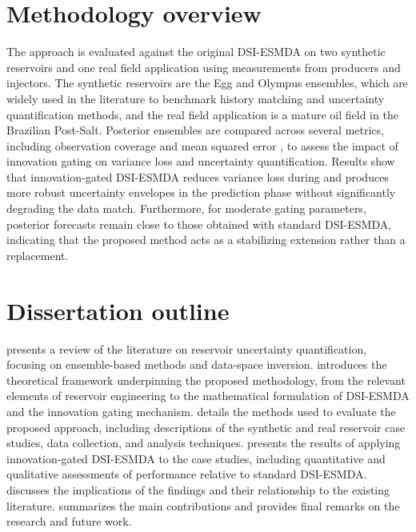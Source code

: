 \section{Methodology overview}

    The approach is evaluated against the original DSI-ESMDA on two synthetic reservoirs 
    and one real field application using measurements from producers and injectors.
    The synthetic reservoirs are the Egg 
    \cite{Jansen:2014}
    and Olympus 
    \cite{Fonseca:2020}
    ensembles, which are widely used in the literature to 
    benchmark history matching and uncertainty quantification methods,
    and the real field application is a mature oil field in the Brazilian Post-Salt.
    Posterior ensembles are compared across several metrics, 
    including observation coverage and mean squared error
    \cite[subsection 9.4.2]{Emerick:2025}, 
    to assess the impact of innovation gating on variance loss and uncertainty quantification.
    Results show that innovation-gated DSI-ESMDA reduces variance loss during and produces 
    more robust uncertainty envelopes in the prediction phase without significantly degrading the data match.
    Furthermore, for moderate gating parameters, posterior forecasts remain close to those obtained with standard DSI-ESMDA, 
    indicating that the proposed method acts as a stabilizing extension rather than a replacement.

\section{Dissertation outline}

    presents a review of the literature on reservoir uncertainty quantification, focusing on ensemble-based methods and data-space inversion.
    introduces the theoretical framework underpinning the proposed methodology, 
    from the relevant elements of reservoir engineering 
    to the mathematical formulation of DSI-ESMDA and the innovation gating mechanism.
    details the methods used to evaluate the proposed approach, including descriptions of the synthetic and real reservoir case studies, data collection, and analysis techniques.
    presents the results of applying innovation-gated DSI-ESMDA to the case studies, including quantitative and qualitative assessments of performance relative to standard DSI-ESMDA.
    discusses the implications of the findings and their relationship to the existing literature.
    summarizes the main contributions and provides final remarks on the research and future work.